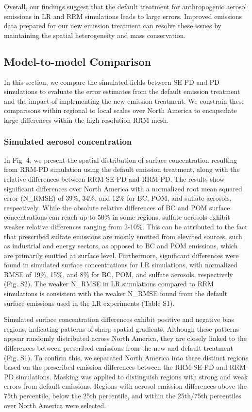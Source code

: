 Overall, our findings suggest that the default treatment for anthropogenic aerosol emissions in LR and RRM simulations leads to large errors. Improved emissions data prepared for our new emission treatment can resolve these issues by maintaining the spatial heterogeneity and mass conservation.

\subsection{Model-to-model Comparison}

In this section, we compare the simulated fields between SE-PD and PD simulations to evaluate the error estimates from the default emission treatment and the impact of implementing the new emission treatment. We constrain these comparisons within regional to local scales over North America to encapsulate large differences within the high-resolution RRM mesh.

\subsubsection{Simulated aerosol concentration}
In Fig. 4, we present the spatial distribution of surface concentration resulting from RRM-PD simulation using the default emission treatment, along with the relative differences between RRM-SE-PD and RRM-PD. The results show significant differences over North America with a normalized root mean squared error (N\_RMSE) of 39\%, 34\%, and 12\% for BC, POM, and sulfate aerosols, respectively. While the absolute relative differences of BC and POM surface concentrations can reach up to 50\% in some regions, sulfate aerosols exhibit weaker relative differences ranging from 2-10\%. This can be attributed to the fact that prescribed sulfate emissions are mostly emitted from elevated sources, such as industrial and energy sectors, as opposed to BC and POM emissions, which are primarily emitted at surface level. Furthermore, significant differences were found in simulated surface concentrations for LR simulations, with normalized RMSE of 19\%, 15\%, and 8\% for BC, POM, and sulfate aerosols, respectively (Fig. S2). The weaker N\_RMSE in LR simulations compared to RRM simulations is consistent with the weaker N\_RMSE found from the default surface emissions used in the LR experiments (Table S1).

Simulated surface concentration differences exhibit positive and negative bias regions, indicating patterns of sharp spatial gradients. Although these patterns appear randomly distributed across North America, they are closely linked to the differences between prescribed emissions from the new and default treatment (Fig. S1). To confirm this, we separated North America into three distinct regions based on the prescribed emission differences between the RRM-SE-PD and RRM-PD simulations. Masking was applied to distinguish regions with strong and weak errors from default emissions. Regions with aerosol emission differences above the 75th percentile, below the 25th percentile, and within the 25th/75th percentiles over North America were selected.

